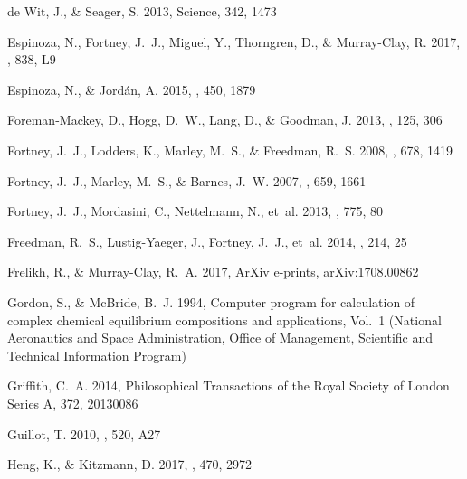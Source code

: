 \documentclass[twocolumn, trackchanges]{aastex61}
\begin{document}
\begin{thebibliography}{}
{de Wit}, J., \& {Seager}, S. 2013, Science, 342, 1473

{Espinoza}, N., {Fortney}, J.~J., {Miguel}, Y., {Thorngren}, D., \&
  {Murray-Clay}, R. 2017, \apjl, 838, L9

{Espinoza}, N., \& {Jord{\'a}n}, A. 2015, \mnras, 450, 1879

{Foreman-Mackey}, D., {Hogg}, D.~W., {Lang}, D., \& {Goodman}, J. 2013, \pasp,
  125, 306

{Fortney}, J.~J., {Lodders}, K., {Marley}, M.~S., \& {Freedman}, R.~S. 2008,
  \apj, 678, 1419

{Fortney}, J.~J., {Marley}, M.~S., \& {Barnes}, J.~W. 2007, \apj, 659, 1661

{Fortney}, J.~J., {Mordasini}, C., {Nettelmann}, N., {et~al.} 2013, \apj, 775,
  80


{Freedman}, R.~S., {Lustig-Yaeger}, J., {Fortney}, J.~J., {et~al.} 2014, \apjs,
  214, 25

{Frelikh}, R., \& {Murray-Clay}, R.~A. 2017, ArXiv e-prints, arXiv:1708.00862


Gordon, S., \& McBride, B.~J. 1994, Computer program for calculation of complex
  chemical equilibrium compositions and applications, Vol.~1 (National
  Aeronautics and Space Administration, Office of Management, Scientific and
  Technical Information Program)

{Griffith}, C.~A. 2014, Philosophical Transactions of the Royal Society of
  London Series A, 372, 20130086

{Guillot}, T. 2010, \aap, 520, A27

{Heng}, K., \& {Kitzmann}, D. 2017, \mnras, 470, 2972


\end{thebibliography}
\end{document}
